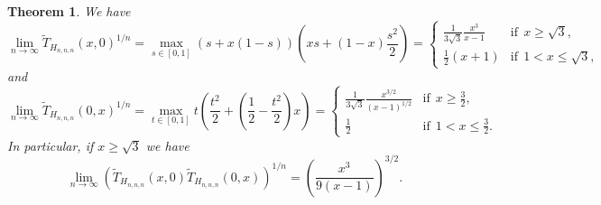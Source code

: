 \documentclass[12pt,a4paper]{amsart}
\numberwithin{equation}{section}
\theoremstyle{plain}
\newtheorem{Th}{Theorem}[section]
\theoremstyle{definition}
\newcommand{\1}{\textbf{1}}
\newcommand{\wT}{\widetilde{T}}
\begin{document}
\begin{Th} We have
$$\lim_{n\to \infty}\wT_{H_{n,n,n}}(x,0)^{1/n}=\max_{s\in [0,1]}\left(s+x(1-s)\right)\left(xs+(1-x)\frac{s^2}{2}\right)=\begin{cases}\frac{1}{3\sqrt{3}}\frac{x^3}{x-1} &\text{if}\ \ x\geqslant\sqrt{3}, \\ 
\frac{1}{2}(x+1) &\text{if}\ \ 1< x\leqslant   \sqrt{3},\end{cases}$$
and 
$$\lim_{n\to \infty}\wT_{H_{n,n,n}}(0,x)^{1/n}=\max_{t\in [0,1]} t\left(\frac{t^2}{2}+\left(\frac{1}{2}-\frac{t^2}{2}\right)x\right)=\begin{cases}\frac{1}{3\sqrt{3}}\frac{x^{3/2}}{(x-1)^{1/2}} &\text{if}\ \ x\geqslant\frac{3}{2},  \\ 
\frac{1}{2} &\text{if}\ \ 1< x\leqslant   \frac{3}{2}.
\end{cases}$$
In particular, if $x\geqslant\sqrt{3}$ we have
$$\lim_{n\to \infty}\left(\wT_{H_{n,n,n}}(x,0)\wT_{H_{n,n,n}}(0,x)\right)^{1/n}=\left(\frac{x^3}{9(x-1)}\right)^{3/2}.$$
\end{Th}
\end{document}
